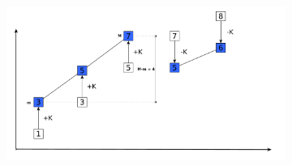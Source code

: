 \begin{figure}
	
	\medskip
	\begin{subfigure}[t]{0.99\textwidth}
		\centering
		\includegraphics[width=1\linewidth]{sources/smallest_range/images/bars4}
		\label{fig:smallest_range:bars4}
	\end{subfigure}
\end{figure}



